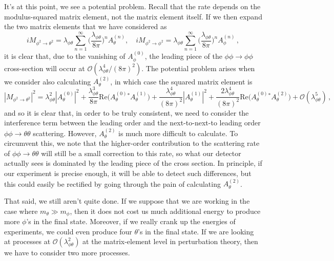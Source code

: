\documentclass{article}
\numberwithin{equation}{subsection}
\begin{document}
It's at this point, we see a potential problem. Recall that the rate depends on the modulus-squared matrix element, not the matrix element itself.
If we then expand the two matrix elements that we have considered as
\begin{equation}
	iM_{\phi^2\to\theta^2} = \lambda_{\phi\theta}\sum_{n = 1}^\infty\Big(\frac{\lambda_{\phi\theta}}{8\pi}\Big)^nA_\theta^{(n)}, \quad 
	iM_{\phi^2\to\phi^2} = \lambda_{\phi\theta}\sum_{n = 1}^\infty\Big(\frac{\lambda_{\phi\theta}}{8\pi}\Big)^nA_\phi^{(n)}\,,
\end{equation}
it is clear that, due to the vanishing of $A_\phi^{(0)}$, the leading piece of the $\phi\phi\to\phi\phi$ cross-section will occur at $\mathcal{O}(\lambda_{\phi\theta}^4/(8\pi)^2)$.
The potential problem arises when we consider also calculating $A_\theta^{(2)}$, in which case the squared matrix element is
\begin{equation}
	|M_{\phi^2\to\theta^2}|^2 = \lambda_{\phi\theta}^2|A_\theta^{(0)}|^2 + \frac{\lambda_{\phi\theta}^3}{8\pi}\text{Re}\Big(A_\theta^{(0)}{}^*A_\theta^{(1)}\Big)
	+ \frac{\lambda_{\phi\theta}^4}{(8\pi)^2}|A_\theta^{(1)}|^2 
	+ \frac{2\lambda_{\phi\theta}^4}{(8\pi)^2}\text{Re}\Big(A_\theta^{(0)}{}^*A_\theta^{(2)}\Big) + \mathcal{O}(\lambda_{\phi\theta}^5)\,,
\end{equation}
and so it is clear that, in order to be truly consistent, we need to consider the interference term between the leading order and the next-to-next-to leading order
$\phi\phi\to\theta\theta$ scattering. However, $A_\theta^{(2)}$ is much more difficult to calculate. To circumvent this, we note that
the higher-order contribution to the scattering rate of $\phi\phi\to\theta\theta$ will still be a small correction to this rate, so what our detector
actually sees is dominated by the leading piece of the cross section. In principle, if our experiment is precise enough, it will be able to 
detect such differences, but this could easily be rectified by going through the pain of calculating $A_\theta^{(2)}$.

That said, we still aren't quite done. If we suppose that we are working in the case where $m_\theta \gg m_\phi$, then it does not cost us much additional energy
to produce more $\phi$'s in the final state. Moreover, if we really crank up the energies of experiments, we could even produce four $\theta$'s in the final state.
If we are looking at processes at $\mathcal{O}(\lambda_{\phi\theta}^2)$ at the matrix-element level in perturbation theory, then we have to consider two more processes.
\end{document}
